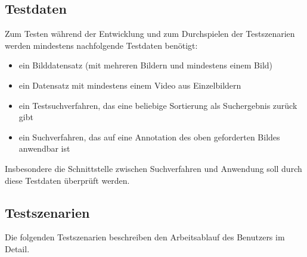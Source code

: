 \subsection{Testdaten}
Zum Testen während der Entwicklung und zum Durchspielen der Testszenarien werden mindestens nachfolgende Testdaten benötigt:
\begin{itemize}
	\item ein Bilddatensatz (mit mehreren Bildern und mindestens einem  Bild)
	\item ein Datensatz mit mindestens einem Video aus Einzelbildern
	\item ein Testsuchverfahren, das eine beliebige Sortierung als Suchergebnis zurück gibt
	\item ein \gls{Suchverfahren}, das auf eine \gls{Annotation} des oben geforderten  Bildes anwendbar ist
\end{itemize}
Insbesondere die Schnittstelle zwischen \gls{Suchverfahren} und Anwendung soll durch diese Testdaten überprüft werden.

\subsection{Testszenarien}
Die folgenden Testszenarien beschreiben den Arbeitsablauf des Benutzers im Detail.


